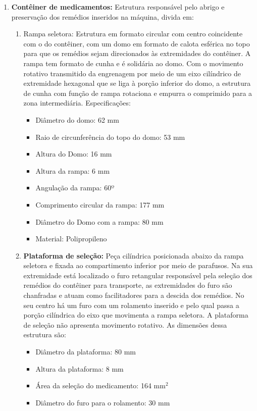 \begin{enumerate}
\item \textbf{Contêiner de medicamentos:} Estrutura responsável pelo abrigo e preservação dos remédios inseridos na máquina, divida em:
\begin{enumerate}
    \item Rampa seletora: Estrutura em formato circular com centro coincidente com o do contêiner, com um domo em formato de calota esférica no topo para que os remédios sejam direcionados às extremidades do contêiner. A rampa tem formato de cunha e é solidária ao domo. Com o movimento rotativo transmitido da engrenagem por meio de um eixo cilíndrico de extremidade hexagonal que se liga à porção inferior do domo, a estrutura de cunha com função de rampa rotaciona e empurra o comprimido para a zona intermediária.
    Especificações:
    \begin{itemize}
        \item Diâmetro do domo: 62 mm
        \item Raio de circunferência do topo do domo: 53 mm
        \item Altura do Domo: 16 mm
        \item Altura da rampa: 6 mm
        \item Angulação da rampa: 60º
        \item Comprimento circular da rampa: 177 mm
        \item Diâmetro do Domo com a rampa: 80 mm
        \item Material: Polipropileno
    \end{itemize}
    \item \textbf{Plataforma de seleção:} Peça cilíndrica posicionada abaixo da rampa seletora e fixada ao compartimento inferior por meio de parafusos. Na sua extremidade está localizado o furo retangular responsável pela seleção dos remédios do contêiner para transporte, as extremidades do furo são chanfradas e atuam como facilitadores para a descida dos remédios. No seu centro há um furo com um rolamento inserido e pelo qual passa a porção cilíndrica do eixo que movimenta a rampa seletora. A plataforma de seleção não apresenta movimento rotativo. As dimensões dessa estrutura são:
    \begin{itemize}
        \item Diâmetro da plataforma: 80 mm
        \item Altura da plataforma: 8 mm
        \item Área da seleção do medicamento: 164 mm$^2$
        \item Diâmetro do furo para o rolamento: 30 mm

\end{itemize}
\end{enumerate}
\end{enumerate}
